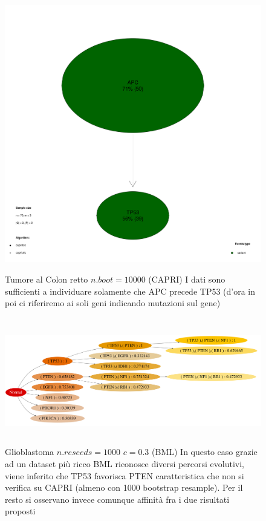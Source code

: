 \documentclass[a4paper]{article}
\begin{document}
	\begin{figure}[H]
	  \centering
	  \includegraphics[height=12cm, keepaspectratio]{COL_RESIC_capri.png}%
	  \captionsetup{justification=centering,margin=0.5cm}
	  \caption{Tumore al Colon retto $n.boot=10000$ (CAPRI) I dati sono sufficienti a individuare solamente che APC precede TP53 (d'ora in poi ci riferiremo ai soli geni indicando mutazioni sul gene)}
	\end{figure}

	\begin{figure}[H]
	  \centering
	  \includegraphics[height=5.5cm, keepaspectratio]{GBM_SM4.png}%
	  \captionsetup{justification=centering,margin=0.5cm}
	  \caption{Glioblastoma $n.reseeds=1000$ $c=0.3$ (BML) In questo caso grazie ad un dataset più ricco BML riconosce diversi percorsi evolutivi, viene inferito che TP53 favorisca PTEN caratteristica che non si
	            verifica su CAPRI (almeno con 1000 bootstrap resample). Per il resto si osservano invece comunque affinità fra i due risultati proposti } 
	\end{figure}
\end{document}
